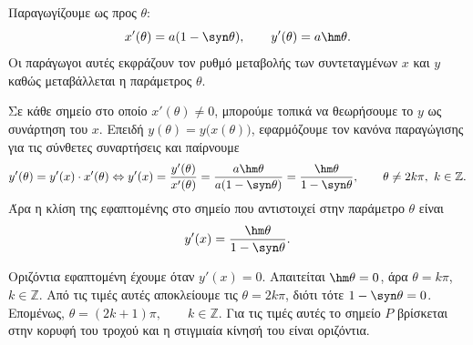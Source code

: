 \begin{alist}
\item Παραγωγίζουμε ως προς $\theta$:
\[
    x'(\theta) = a(1 - \syn\theta),
    \qquad
    y'(\theta) = a\hm\theta.
\]
Οι παράγωγοι αυτές εκφράζουν τον ρυθμό μεταβολής των συντεταγμένων
$x$ και $y$ καθώς μεταβάλλεται η παράμετρος $\theta$.

\item
Σε κάθε σημείο στο οποίο $x'(\theta)\neq 0$, μπορούμε τοπικά να
θεωρήσουμε το $y$ ως συνάρτηση του $x$. Επειδή $y(\theta)=y\bigl(x(\theta)\bigr)$, εφαρμόζουμε τον κανόνα παραγώγισης για τις σύνθετες συναρτήσεις και παίρνουμε
\[
  y'(\theta)=y'(x)\cdot x'(\theta)\Leftrightarrow
  y'(x)
  =\frac{y'(\theta)}{x'(\theta)}
  =\frac{a\hm\theta}{a(1-\syn\theta)}
  =\frac{\hm\theta}{1-\syn\theta},
  \qquad \theta\neq 2k\pi,\ k\in\mathbb{Z}.
\]
Άρα η κλίση της εφαπτομένης στο σημείο που αντιστοιχεί στην παράμετρο
$\theta$ είναι
\[
  y'(x)=\frac{\hm\theta}{1-\syn\theta}.
\]

\item
Οριζόντια εφαπτομένη έχουμε όταν $y'(x)=0$. Απαιτείται
$\hm\theta=0$, άρα $\theta=k\pi$, $k\in\mathbb{Z}$. Από τις τιμές αυτές
αποκλείουμε τις $\theta=2k\pi$, διότι τότε
$1-\syn\theta=0$. Επομένως, $\theta=(2k+1)\pi,\qquad k\in\mathbb{Z}$.
Για τις τιμές αυτές το σημείο $P$ βρίσκεται στην κορυφή του τροχού και
η στιγμιαία κίνησή του είναι οριζόντια.

\begin{center}
\end{center}
\end{alist}
